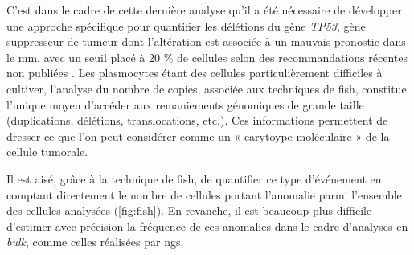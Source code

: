 C'est dans le cadre de cette dernière analyse qu'il a été nécessaire de développer une approche spécifique pour quantifier les délétions du gène \textit{TP53}, 
gène suppresseur de tumeur dont l'altération est associée à un mauvais pronostic dans le \gls{mm}, avec un seuil placé à 20 \% de cellules selon des recommandations 
récentes non publiées \cite{flyntPrognosisBiologyTargeting2020}.
Les plasmocytes étant des cellules particulièrement difficiles à cultiver, l'analyse du nombre de copies, associée aux techniques de \gls{fish}, constitue l'unique 
moyen d'accéder aux remaniements génomiques de grande taille (duplications, délétions, translocations, etc.).
Ces informations permettent de dresser ce que l'on peut considérer comme un « carytoype moléculaire » de la cellule tumorale. 

\vspace{1em}

Il est aisé, grâce à la technique de \gls{fish}, de quantifier ce type d'événement en comptant directement le nombre de cellules portant l'anomalie parmi l'ensemble des cellules analysées 
(\autoref{fig:fish}).  
En revanche, il est beaucoup plus difficile d'estimer avec précision la fréquence de ces anomalies dans le cadre d'analyses en \textit{bulk}, comme celles réalisées par \gls{ngs}.

